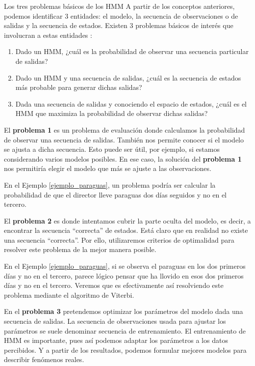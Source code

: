 \begin{section}{Los tres problemas básicos de los HMM}
A partir de los conceptos anteriores, podemos identificar 3 entidades: el modelo, la secuencia de observaciones o de salidas y la secuencia de estados. Existen 3 problemas básicos de interés que involucran a estas entidades \cite{Vidyasagar}:
\begin{enumerate}
\item Dado un HMM, ¿cuál es la probabilidad de observar una secuencia particular de salidas?
\item Dado un HMM y una secuencia de salidas, ¿cuál es la secuencia de estados más probable para generar dichas salidas?
\item Dada una secuencia de salidas y conociendo el espacio de estados, ¿cuál es el HMM que maximiza la probabilidad de observar dichas salidas?
\end{enumerate}

El \textbf{problema 1} es un problema de evaluación donde calculamos la probabilidad de observar una secuencia de salidas. También nos permite conocer si el modelo se ajusta a dicha secuencia. Esto puede ser útil, por ejemplo, si estamos considerando varios modelos posibles. En ese caso, la solución del \textbf{problema 1} nos permitiría elegir el modelo que más se ajuste a las observaciones.

En el Ejemplo \ref{ejemplo_paraguas}, un problema podría ser calcular la probabilidad de que el director lleve paraguas dos días seguidos y no en el tercero.

El \textbf{problema 2} es donde intentamos cubrir la parte oculta del modelo, es decir, a encontrar la secuencia \enquote{correcta} de estados. Está claro que en realidad no existe una secuencia \enquote{correcta}. Por ello, utilizaremos criterios de optimalidad para resolver este problema de la mejor manera posible. 

En el Ejemplo \ref{ejemplo_paraguas}, si se observa el paraguas en los dos primeros días y no en el tercero, parece lógico pensar que ha llovido en esos dos primeros días y no en el tercero. Veremos que es efectivamente así resolviendo este problema mediante el algoritmo de Viterbi.

En el \textbf{problema 3} pretendemos optimizar los parámetros del modelo dada una secuencia de salidas. La secuencia de observaciones usada para ajustar los parámetros se suele denominar secuencia de entrenamiento. El entrenamiento de HMM es importante, pues así podemos adaptar los parámetros a los datos percibidos. Y a partir de los resultados, podemos formular mejores modelos para describir fenómenos reales.


\end{section}
